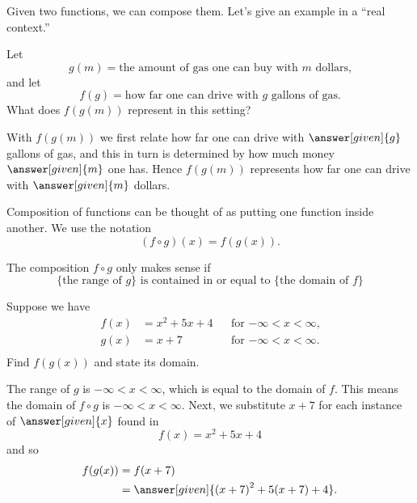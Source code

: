 \documentclass{ximera}
\begin{document}


Given two functions, we can compose them. Let's give an example in a
``real context.''

\begin{example}
  Let
  \[
  g(m) = \text{the amount of gas one can buy with $m$ dollars,}
  \]
  and let
  \[
  f(g) = \text{how far one can drive with $g$ gallons of gas.}
  \]
  What does $f(g(m))$ represent in this setting?
  \begin{explanation}
    With $f(g(m))$ we first relate how far one can drive with
    $\answer[given]{g}$ gallons of gas, and this in turn is determined
    by how much money $\answer[given]{m}$ one has. Hence $f(g(m))$ represents how far
    one can drive with $\answer[given]{m}$ dollars.
  \end{explanation}
\end{example}

Composition of functions can be thought of as putting one function
inside another.  We use the notation
\[
(f\circ g)(x) = f(g(x)).
\]
\begin{warning}
  The composition $f\circ g$ only makes sense if
  \[
  \{\text{the range of $g$}\}
  \text{ is contained in or equal to }
  \{\text{the domain of $f$}\}
  \]
\end{warning}

\begin{example}
 Suppose we have
\begin{align*}
  f(x)&={{x}^{2}}+5x+4 &&\text{for $-\infty< x< \infty$,}\\
  g(x)&= x+7 &&\text{for $-\infty< x< \infty$.}\\
\end{align*}
Find $f(g(x))$ and state its domain.
\begin{explanation}
  The range of $g$ is $-\infty< x< \infty$, which is equal to the
  domain of $f$. This means the domain of $f\circ g$ is $-\infty< x<
  \infty$. Next, we substitute $x+7$ for each instance of $\answer[given]{x}$ found
  in
  \[
  f(x)={{x}^{2}}+5x+4
  \]
  and so
  \begin{align*}
  f(g(x)) &=f(x+7)\\
  &=\answer[given]{{{(x+7)}^{2}}+5(x+7)+4}.
  \end{align*}
\end{explanation}
\end{example}
\end{document}
